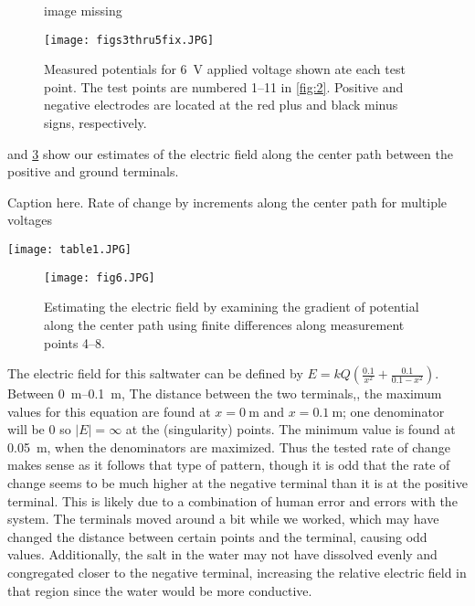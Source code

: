 ﻿\documentclass[10pt,journal,twoside]{IEEEtran}
\begin{document}
\begin{figure}
\begin{center}
image missing
\end{center}
\caption{}
\label{fig:4}
\end{figure}

\begin{figure}
\begin{center}
\texttt{[image: figs3thru5fix.JPG]}
\end{center}
\caption{Measured potentials for \qty{6}{\volt} applied voltage shown ate each test point. The test points are numbered 1--11 in \cref{fig:2}. Positive and negative electrodes are located at the red plus and black minus signs, respectively.}
\label{fig:5}
\end{figure}

 and \cref{fig:6} show our estimates of the electric field along the center path between the positive and ground terminals. 
\begin{table}
\caption{Caption here. Rate of change by increments along the center path for multiple voltages}
\label{tab:1}
\begin{center}
\texttt{[image: table1.JPG]}
\end{center}
\end{table}

\begin{figure}
\begin{center}
\texttt{[image: fig6.JPG]}
\end{center}
\caption{Estimating the electric field by examining the gradient of potential along the center path using finite differences along measurement points 4--8.}
\label{fig:6}
\end{figure}

The electric field for this saltwater can be defined by $E=kQ(\frac{0.1}{x^2}+\frac{0.1}{0.1-x^2})$. Between \qtyrange{0}{0.1}{\meter}, The distance between the two terminals,, the maximum values for this equation are found at $x=\qty{0}{\meter}$ and $x = \qty{0.1}{\meter}$; one denominator will be 0 so $|E| = \infty$ at the (singularity) points. The minimum value is found at \qty{0.05}{\meter}, when the denominators are maximized. Thus the tested rate of change makes sense as it follows that type of pattern, though it is odd that the rate of change seems to be much higher at the negative terminal than it is at the positive terminal. This is likely due to a combination of human error and errors with the system. The terminals moved around a bit while we worked, which may have changed the distance between certain points and the terminal, causing odd values. Additionally, the salt in the water may not have dissolved evenly and congregated closer to the negative terminal, increasing the relative electric field in that region since the water would be more conductive.
\end{document}
